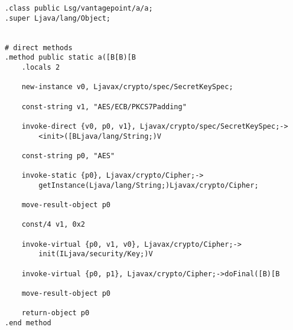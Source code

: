 \begin{verbatim}
.class public Lsg/vantagepoint/a/a;
.super Ljava/lang/Object;


# direct methods
.method public static a([B[B)[B
    .locals 2

    new-instance v0, Ljavax/crypto/spec/SecretKeySpec;

    const-string v1, "AES/ECB/PKCS7Padding"

    invoke-direct {v0, p0, v1}, Ljavax/crypto/spec/SecretKeySpec;->
        <init>([BLjava/lang/String;)V

    const-string p0, "AES"

    invoke-static {p0}, Ljavax/crypto/Cipher;->
        getInstance(Ljava/lang/String;)Ljavax/crypto/Cipher;

    move-result-object p0

    const/4 v1, 0x2

    invoke-virtual {p0, v1, v0}, Ljavax/crypto/Cipher;->
        init(ILjava/security/Key;)V

    invoke-virtual {p0, p1}, Ljavax/crypto/Cipher;->doFinal([B)[B

    move-result-object p0

    return-object p0
.end method
\end{verbatim}
